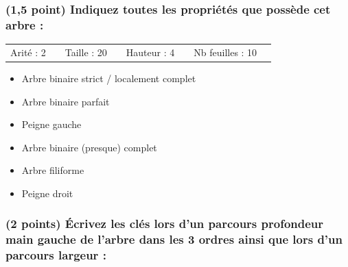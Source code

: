 \documentclass[11pt,a4paper]{article}
\begin{document}
\subsubsection{(1,5 point) Indiquez toutes les propriétés que possède cet arbre : }

\bigskip

\begin{tabular}{L{2cm}C{1.5cm} L{2cm}C{1.5cm} L{2cm}C{1.5cm} L{2.5cm}C{1.5cm}}
Arité : 2 & & Taille : 20 & & Hauteur : 4 & & Nb feuilles : 10 & \\
\end{tabular}

\medskip

\begin{table}[ht!]
  \centering
  \begin{minipage}{0.50\textwidth}
    \centering

\begin{itemize}
  \item[\CaseCoche] Arbre binaire strict / localement complet \phantom{()}
  \item[\CaseCoche] Arbre binaire parfait \phantom{()}
  \item[\CaseCoche] Peigne gauche \phantom{()}
\end{itemize}

  \end{minipage}
  \hfillx
  \begin{minipage}{0.50\textwidth}
    \centering

\begin{itemize}
  \item[\checkmark] Arbre binaire (presque) complet \phantom{()}
  \item[\CaseCoche] Arbre filiforme \phantom{()}
  \item[\CaseCoche] Peigne droit \phantom{()}
\end{itemize}

  \end{minipage}
\end{table}



\subsubsection{(2 points) \'Ecrivez les clés lors d'un parcours profondeur main gauche de l'arbre dans les 3 ordres ainsi que lors d'un parcours largeur : }
\end{document}
